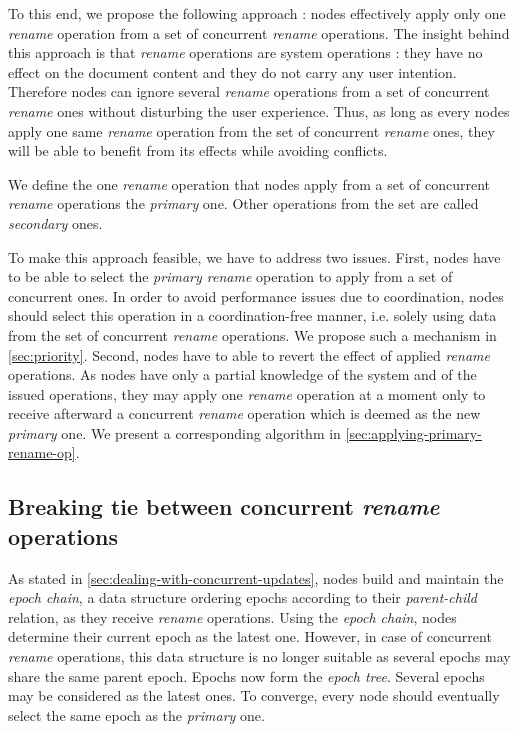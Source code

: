 \documentclass[10pt,journal,compsoc]{IEEEtran}
\newcommand{\ie}{i.e. }
\begin{document}
To this end, we propose the following approach : nodes effectively apply only one \emph{rename} operation from a set of concurrent \emph{rename} operations.
The insight behind this approach is that \emph{rename} operations are system operations : they have no effect on the document content and they do not carry any user intention.
Therefore nodes can ignore several \emph{rename} operations from a set of concurrent \emph{rename} ones without disturbing the user experience.
Thus, as long as every nodes apply one same \emph{rename} operation from the set of concurrent \emph{rename} ones, they will be able to benefit from its effects while avoiding conflicts.

We define the one \emph{rename} operation that nodes apply from a set of concurrent \emph{rename} operations the \emph{primary} one.
Other operations from the set are called \emph{secondary} ones.

To make this approach feasible, we have to address two issues.
First, nodes have to be able to select the \emph{primary rename} operation to apply from a set of concurrent ones.
In order to avoid performance issues due to coordination, nodes should select this operation in a coordination-free manner, \ie solely using data from the set of concurrent \emph{rename} operations.
We propose such a mechanism in \autoref{sec:priority}.
Second, nodes have to able to revert the effect of applied \emph{rename} operations.
As nodes have only a partial knowledge of the system and of the issued operations, they may apply one \emph{rename} operation at a moment only to receive afterward a concurrent \emph{rename} operation which is deemed as the new \emph{primary} one.
We present a corresponding algorithm in \autoref{sec:applying-primary-rename-op}.

\subsection{Breaking tie between concurrent \emph{rename} operations}
\label{sec:priority}

As stated in \autoref{sec:dealing-with-concurrent-updates}, nodes build and maintain the \emph{epoch chain}, a data structure ordering epochs according to their \emph{parent-child} relation, as they receive \emph{rename} operations.
Using the \emph{epoch chain}, nodes determine their current epoch as the latest one.
However, in case of concurrent \emph{rename} operations, this data structure is no longer suitable as several epochs may share the same parent epoch.
Epochs now form the \emph{epoch tree}.
Several epochs may be considered as the latest ones.
To converge, every node should eventually select the same epoch as the \emph{primary} one.
\end{document}
